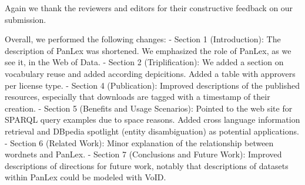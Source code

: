 Again we thank the reviewers and editors for their constructive feedback on our submission.

Overall, we performed the following changes:
- Section 1 (Introduction): The description of PanLex was shortened. We emphasized the role of PanLex, as we see it, in the Web of Data.
- Section 2 (Triplification): We added a section on vocabulary reuse and added according depicitions. Added a table with approvers per license type.
- Section 4 (Publication): Improved descriptions of the published resources, especially that downloads are tagged with a timestamp of their creation. 
- Section 5 (Benefits and Usage Scenarios): Pointed to the web site for SPARQL query examples due to space reasons. Added cross language information retrieval and DBpedia spotlight (entity disambiguation) as potential applications.
- Section 6 (Related Work): Minor explanation of the relationship between wordnets and PanLex.
- Section 7 (Conclusions and Future Work): Improved descriptions of directions for future work, notably that descriptions of datasets within PanLex could be modeled with VoID.


